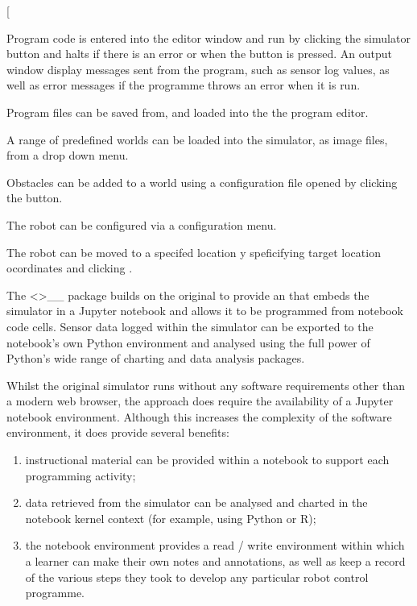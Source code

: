 \documentclass[letterpaper,10pt,english]{sphinxmanual}
\let\sphinxpxdimen\pdfpxdimen\else\newdimen\sphinxpxdimen
\begin{document}
{[}\sphinxincludegraphics[width=1618\sphinxpxdimen,height=1470\sphinxpxdimen]{{EV3DEV_Python_Simulator}.png}

Program code is entered into the editor window and run by clicking the simulator  button and halts if there is an error or when the  button is pressed. An output window display messages sent from the program, such as sensor log values, as well as error messages if the programme throws an error when it is run.

Program files can be saved from, and loaded into the the program editor.

A range of predefined worlds can be loaded into the simulator, as image files, from a drop down menu.

Obstacles can be added to a world using a configuration file opened by clicking the  button.

The robot can be configured via a configuration menu.

The robot can be moved to a specifed location y speficifying target location oc\sphinxhyphen{}ordinates and clicking .

The  \textless{}\textgreater{}\textasciigrave{}\_\_ package builds on the original  to provide an  that embeds the simulator in a Jupyter notebook and allows it to be programmed from notebook code cells. Sensor data logged within the simulator can be exported to the notebook’s own Python environment and analysed using the full power of Python’s wide range of charting and data analysis packages.

Whilst the original  simulator runs without any software requirements other than a modern web browser, the  approach does require the availability of a Jupyter notebook environment. Although this increases the complexity of the software environment, it does provide several benefits:
\begin{enumerate}
%
\item {} 
instructional material can be provided within a notebook to support each programming activity;

\item {} 
data retrieved from the simulator can be analysed and charted in the notebook kernel context (for example, using Python or R);

\item {} 
the notebook environment provides a read / write environment within which a learner can make their own notes and annotations, as well as keep a record of the various steps they took to develop any particular robot control programme.

\end{enumerate}
\end{document}
